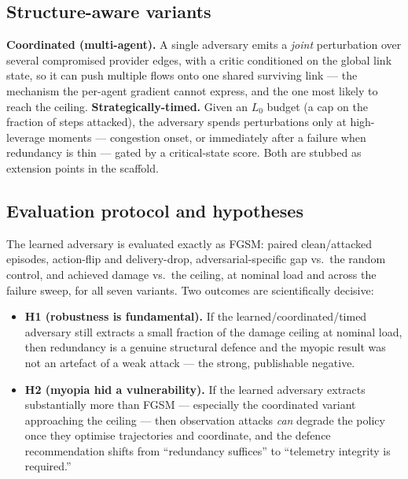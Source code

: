 \documentclass[10pt,journal,comsoc]{IEEEtran}
\begin{document}
\subsection{Structure-aware variants}
\textbf{Coordinated (multi-agent).} A single adversary emits a \emph{joint}
perturbation over several compromised provider edges, with a critic conditioned on the
global link state, so it can push multiple flows onto one shared surviving link ---
the mechanism the per-agent gradient cannot express, and the one most likely to reach
the ceiling. \textbf{Strategically-timed.} Given an $L_0$ budget (a cap on the fraction
of steps attacked), the adversary spends perturbations only at high-leverage moments
--- congestion onset, or immediately after a failure when redundancy is thin --- gated
by a critical-state score. Both are stubbed as extension points in the scaffold.

\subsection{Evaluation protocol and hypotheses}
The learned adversary is evaluated exactly as FGSM: paired clean/attacked episodes,
action-flip and delivery-drop, adversarial-specific gap vs.\ the random control, and
achieved damage vs.\ the ceiling, at nominal load and across the failure sweep, for all
seven variants. Two outcomes are scientifically decisive:
\begin{itemize}
  \item \textbf{H1 (robustness is fundamental).} If the learned/coordinated/timed
  adversary still extracts a small fraction of the damage ceiling at nominal load, then
  redundancy is a genuine structural defence and the myopic result was not an artefact
  of a weak attack --- the strong, publishable negative.
  \item \textbf{H2 (myopia hid a vulnerability).} If the learned adversary extracts
  substantially more than FGSM --- especially the coordinated variant approaching the
  ceiling --- then observation attacks \emph{can} degrade the policy once they optimise
  trajectories and coordinate, and the defence recommendation shifts from ``redundancy
  suffices'' to ``telemetry integrity is required.''
\end{itemize}
\end{document}
